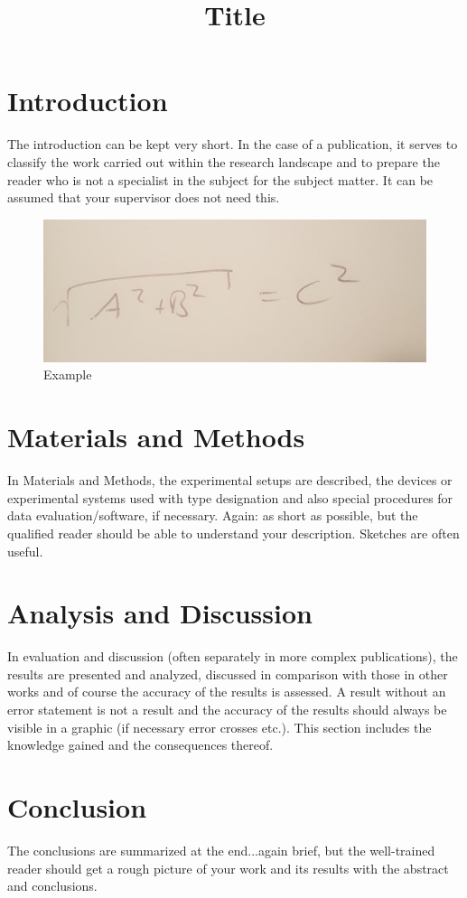 \documentclass[bibliography=totocnumbered,twocolumn]{scrarticle}
\title{Title}
\begin{document}
    \twocolumn[
        \begin{@twocolumnfalse}
            \maketitle
            \begin{abstract}
                
            \end{abstract}
        \end{@twocolumnfalse}
    ]
    \section{Introduction}
        The introduction can be kept very short. In the case of a publication, it serves to classify the work carried out within the research landscape and to prepare the reader who is not a specialist in the subject for the subject matter. It can be assumed that your supervisor does not need this.
        
        \begin{figure}[H]
            \centering
            \includegraphics[width=\linewidth]{figures/Template/example.jpeg}
            \caption{Example}
            \label{fig: exp}
        \end{figure}
    \section{Materials and Methods}
        In Materials and Methods, the experimental setups are described, the devices or experimental systems used with type designation and also special procedures for data evaluation/software, if necessary. Again: as short as possible, but the qualified reader should be able to understand your description. Sketches are often useful.
    \newpage
    \section{Analysis and Discussion}
        In evaluation and discussion (often separately in more complex publications), the results are presented and analyzed, discussed in comparison with those in other works and of course the accuracy of the results is assessed. A result without an error statement is not a result and the accuracy of the results should always be visible in a graphic (if necessary error crosses etc.). This section includes the knowledge gained and the consequences thereof.
    \section{Conclusion}
        The conclusions are summarized at the end...again brief, but the well-trained reader should get a rough picture of your work and its results with the abstract and conclusions.
\end{document}
